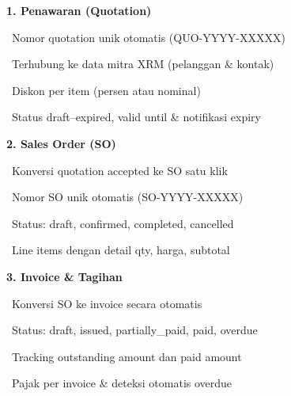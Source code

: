 \documentclass[a4paper]{article}
\begin{document}
\vspace{6pt}

\noindent
\begin{minipage}[t]{0.485\textwidth}

    {\fontsize{10.5}{13}\selectfont\bfseries\color{IndigoPrimary} 1. Penawaran (Quotation)}
    \vspace{3pt}

    {\fontsize{9}{13}\selectfont\color{TextDark}%
    \textbullet\ Nomor quotation unik otomatis (QUO-YYYY-XXXXX)\par\vspace{2pt}%
    \textbullet\ Terhubung ke data mitra XRM (pelanggan \& kontak)\par\vspace{2pt}%
    \textbullet\ Diskon per item (persen atau nominal)\par\vspace{2pt}%
    \textbullet\ Status draft--expired, valid until \& notifikasi expiry}%
    \vspace{8pt}

    {\fontsize{10.5}{13}\selectfont\bfseries\color{IndigoPrimary} 2. Sales Order (SO)}
    \vspace{3pt}

    {\fontsize{9}{13}\selectfont\color{TextDark}%
    \textbullet\ Konversi quotation accepted ke SO satu klik\par\vspace{2pt}%
    \textbullet\ Nomor SO unik otomatis (SO-YYYY-XXXXX)\par\vspace{2pt}%
    \textbullet\ Status: draft, confirmed, completed, cancelled\par\vspace{2pt}%
    \textbullet\ Line items dengan detail qty, harga, subtotal}%
    \vspace{8pt}

    {\fontsize{10.5}{13}\selectfont\bfseries\color{IndigoPrimary} 3. Invoice \& Tagihan}
    \vspace{3pt}

    {\fontsize{9}{13}\selectfont\color{TextDark}%
    \textbullet\ Konversi SO ke invoice secara otomatis\par\vspace{2pt}%
    \textbullet\ Status: draft, issued, partially\_paid, paid, overdue\par\vspace{2pt}%
    \textbullet\ Tracking outstanding amount dan paid amount\par\vspace{2pt}%
    \textbullet\ Pajak per invoice \& deteksi otomatis overdue}%

\end{minipage}%
\end{document}
